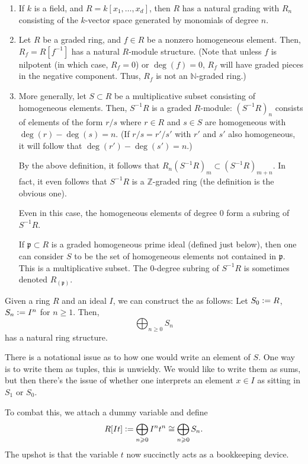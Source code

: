 \documentclass[12pt]{article}
\begin{document}
\begin{ex}
	\begin{enumerate}
		\item If $k$ is a field, and $R = k[x_{1}, \ldots, x_{d}]$, then $R$ has a natural grading with $R_{n}$ consisting of the $k$-vector space generated by monomials of degree $n$. 
		\item Let $R$ be a graded ring, and $f \in R$ be a nonzero homogeneous element. Then, $R_{f} = R[f^{-1}]$ has a natural $R$-module structure. (Note that unless $f$ is nilpotent (in which case, $R_{f} = 0$) or $\deg(f) = 0$, $R_{f}$ will have graded pieces in the negative component. Thus, $R_{f}$ is not an $\mathbb{N}$-graded ring.)
		\item More generally, let $S \subset R$ be a multiplicative subset consisting of homogeneous elements. Then, $S^{-1}R$ is a graded $R$-module: $(S^{-1} R)_{n}$ consists of elements of the form $r/s$ where $r \in R$ and $s \in S$ are homogeneous with $\deg(r) - \deg(s) = n$. (If $r/s = r'/s'$ with $r'$ and $s'$ also homogeneous, it will follow that $\deg(r') - \deg(s') = n$.) 

		By the above definition, it follows that $R_{n} (S^{-1} R)_{m} \subset (S^{-1} R)_{m + n}$. In fact, it even follows that $S^{-1}R$ is a $\mathbb{Z}$-graded ring (the definition is the obvious one). 

		Even in this case, the homogeneous elements of degree $0$ form a subring of $S^{-1} R$. 

		If $\mathfrak{p} \subset R$ is a graded homogeneous prime ideal (defined just below), then one can consider $S$ to be the set of homogeneous elements not contained in $\mathfrak{p}$. This is a multiplicative subset. The $0$-degree subring of $S^{-1} R$ is sometimes denoted $R_{(\mathfrak{p})}$.	
	\end{enumerate}
\end{ex}

\begin{ex} \label{ex:rees-algebra}
	Given a ring $R$ and an ideal $I$, we can construct the  as follows: \newline
	Let $S_{0} \vcentcolon= R$, $S_{n} \vcentcolon= I^{n}$ for $n \ge 1$. Then,
	\begin{equation*} 
		\bigoplus_{n \ge 0} S_{n}
	\end{equation*}
	has a natural ring structure.

	There is a notational issue as to how one would write an element of $S$. One way is to write them as tuples, this is unwieldy. We would like to write them as sums, but then there's the issue of whether one interprets an element $x \in I$ as sitting in $S_{1}$ or $S_{0}$. 

	To combat this, we attach a dummy variable and define
	\begin{equation*} 
		R[It] \vcentcolon= \bigoplus_{n \ge 0} I^{n} t^{n} \cong \bigoplus_{n \ge 0} S_{n}.
	\end{equation*}
	The upshot is that the variable $t$ now succinctly acts as a bookkeeping device. 
\end{ex}
\end{document}
